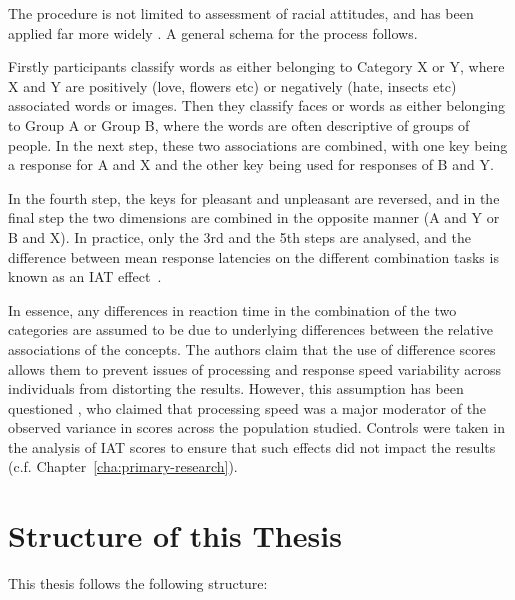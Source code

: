 The procedure is not limited to assessment of racial attitudes, and has been applied far more widely \cite{Craeynest2008,Greenwald2009, Schmukle2008,Walker2008}.  A general schema for the process follows.   

Firstly participants classify words as either belonging to Category X or Y, where X and Y are positively (love, flowers etc) or negatively (hate, insects etc) associated words or images.  Then they classify faces or words
as either belonging to Group A or Group B, where the words are often descriptive of groups of people.  In the next step, these two associations are combined, with one key being a response for A and X and the other key being used for responses of B and Y. 

In the fourth step, the keys for pleasant and unpleasant are reversed, and in the final step the two dimensions are combined in the opposite manner (A and Y or B and X). In practice, only the 3rd and the 5th steps are analysed, and the difference between mean response latencies on the different combination tasks is known as an IAT effect~\cite{Greenwald1998}. 

In essence, any differences in reaction time in the combination of the two categories are assumed to be due to underlying differences between the relative associations of the concepts. The authors claim that the use of difference scores allows them to prevent issues of processing and response speed variability across individuals from distorting the results. However, this assumption has been questioned \cite{Blanton2006}, who claimed that processing speed was a major moderator of the observed variance in scores across the population studied. Controls were taken in the analysis of IAT scores to ensure that such effects did not impact the results (c.f. Chapter~\ref{cha:primary-research}). 

\section{Structure of this Thesis}
\label{sec:struct-this-thes}



This thesis follows the following structure:

